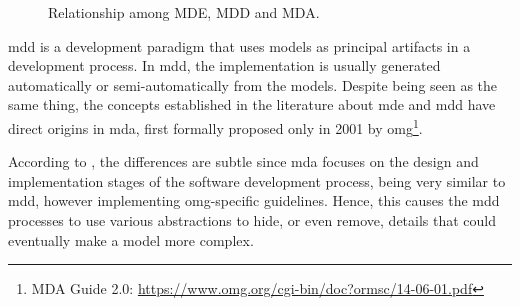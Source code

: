 \begin{figure}[!htb]
    \centering
    \caption{Relationship among MDE, MDD and MDA.}
    
    \label{fig:MDE}
\end{figure}

\ac{mdd} is a development paradigm that uses models as principal artifacts in a development process.
In \ac{mdd}, the implementation is usually generated automatically or semi-automatically from the models.
Despite being seen as the same thing, the concepts established in the literature about \ac{mde} and \ac{mdd} have direct origins in \ac{mda}, first formally proposed only in 2001 by \ac{omg}\footnote{MDA Guide 2.0: \url{ https://www.omg.org/cgi-bin/doc?ormsc/14-06-01.pdf}}.

According to \cite{Sommerville:2015}, the differences are subtle since \ac{mda} focuses on the design and implementation stages of the software development process, being very similar to \ac{mdd}, however implementing \ac{omg}-specific guidelines.
Hence, this causes the \ac{mdd} processes to use various abstractions to hide, or even remove, details that could eventually make a model more complex.


